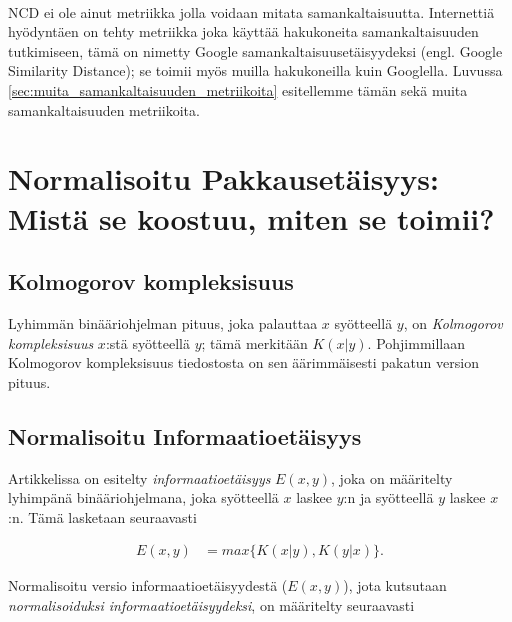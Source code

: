 \documentclass[11pt,finnish]{tktltiki2}
\theoremstyle{definition}
\theoremstyle{remark}
\begin{document}

\paragraph{} %
\label{par:intro-5}
  NCD ei ole ainut metriikka jolla voidaan mitata samankaltaisuutta. Internettiä hyödyntäen on tehty metriikka joka käyttää hakukoneita samankaltaisuuden tutkimiseen, tämä on nimetty Google samankaltaisuusetäisyydeksi (engl. Google Similarity Distance); se toimii myös muilla hakukoneilla kuin Googlella. Luvussa \ref{sec:muita_samankaltaisuuden_metriikoita} esitellemme tämän sekä muita samankaltaisuuden metriikoita.



\section{Normalisoitu Pakkausetäisyys: Mistä se koostuu, miten se toimii?} %
\label{sec:normalisoitu_pakkauset_isyys}
  \subsection{Kolmogorov kompleksisuus} %
\label{sub:kolmogorov_kompleksisuus}

  Lyhimmän binääriohjelman pituus, joka palauttaa $x$ syötteellä $y$, on \emph{Kolmogorov kompleksisuus} $x$:stä syötteellä $y$; tämä merkitään $K(x|y)$. Pohjimmillaan Kolmogorov kompleksisuus tiedostosta on sen äärimmäisesti pakatun version pituus.

\subsection{Normalisoitu Informaatioetäisyys} %
\label{sub:normalisoitu_informaatioet_isyys}

  Artikkelissa \cite{CV05} on esitelty \emph{informaatioetäisyys} $E(x,y)$, joka on määritelty lyhimpänä binääriohjelmana, joka syötteellä $x$ laskee $y$:n ja syötteellä $y$ laskee $x$:n. Tämä lasketaan seuraavasti \cite{10.1109/WDM.2004.1358107}

  \begin{align}
    E(x,y) &= max\{K(x|y),K(y|x)\}.
  \end{align}

  Normalisoitu versio informaatioetäisyydestä ($E(x,y)$), jota kutsutaan \emph{normalisoiduksi informaatioetäisyydeksi}, on määritelty seuraavasti
\end{document}
